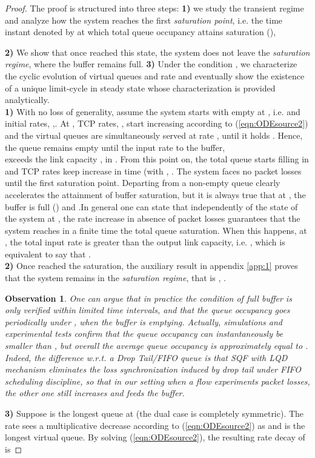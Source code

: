 \documentclass[a4paper,oneside, 11pt]{article}
\newtheorem{obs}[theorem]{Observation}
\begin{document}
\begin{proof}
The proof is structured into three steps: \textbf{1)} we  study the transient regime
and analyze how the system reaches the first \textit{saturation point},
i.e. the time instant denoted by  at which total queue occupancy  attains saturation (),

\textbf{2)} We show that once reached this state, the system does not leave the \textit{saturation regime}, where the buffer remains full.
\textbf{3)} Under the condition , we characterize the cyclic evolution of virtual queues and rate and eventually
show the existence of a unique limit-cycle in steady state whose characterization is provided analytically.\\
\textbf{1)} With no loss of generality, assume  the system starts with  empty at , i.e.  and initial rates, ,.
At , TCP rates, ,  start increasing  according to (\ref{eqn:ODEsource2}) and the virtual queues are simultaneously served at rate ,  until it holds .
Hence, the queue  remains empty until the input rate to the buffer, \\

exceeds the link capacity , in .
From this point on, the total queue starts filling in and TCP rates keep increase in time (with , .
The system faces no packet losses until the first saturation point.
Departing from a non-empty queue clearly accelerates the attainment of buffer saturation, but it is always true that
at , the buffer is full () and .In general one can state that independently of the state of the system at , the rate increase in absence of packet losses guarantees that the system reaches in a finite time  the total queue saturation. When this happens, at , the total input rate is greater than the output link capacity, i.e. , which is equivalent to say that .
\\\textbf{2)} Once reached the saturation, the auxiliary result in appendix \ref{app:1} proves that the system remains in the \textit{saturation regime}, that is , .\begin{obs}
 One can argue that in practice the condition of full buffer is only verified within limited time intervals, and that the queue occupancy goes periodically under , when the buffer is emptying. Actually,  simulations and experimental tests confirm that the queue occupancy can instantaneously be smaller than , but overall the  average queue occupancy is approximately equal to . Indeed,
the difference w.r.t. a Drop Tail/FIFO queue is that SQF with LQD  mechanism eliminates the loss synchronization induced by drop tail under FIFO scheduling discipline, so that in our setting when a flow experiments packet losses, the other one still increases and feeds the buffer.
\end{obs}\textbf{3)}
Suppose  is the longest queue at  (the dual case is completely symmetric).
The rate  sees a multiplicative decrease according to (\ref{eqn:ODEsource2})
as  and  is the longest virtual queue. By solving (\ref{eqn:ODEsource2}), the resulting rate decay of  is 


\end{proof}
\end{document}
